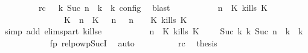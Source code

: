 \begin{isabellebody}
\ \ \ \ \ \ \ \ \ rc{\isacharcolon}{\isacartoucheopen}{\isasymrho}\ {\isasymin}\ {\isasymlbrakk}\ {\isasymGamma}\isactrlsub k{\isacharcomma}\ Suc\ n\ {\isasymturnstile}\ {\isasymPsi}\isactrlsub k\ {\isasymtriangleright}\ {\isasymPhi}\isactrlsub k\ {\isasymrbrakk}\isactrlsub c\isactrlsub o\isactrlsub n\isactrlsub f\isactrlsub i\isactrlsub g{\isacartoucheclose}\ \isamarkupfalse%
\ blast\isanewline
\ \ \ \ \ \ \ \ \isamarkupfalse%
\ {\isacartoucheopen}{\isacharparenleft}{\isasymGamma}{\isacharcomma}\ n\ {\isasymturnstile}\ {\isacharparenleft}{\isacharparenleft}K\ kills\ K\ {\isacharhash}\ {\isasymPsi}{\isacharparenright}\ {\isasymtriangleright}\ {\isasymPhi}{\isacharparenright}\isanewline
\ \ \ \ \ \ \ \ \ \ \ \ \ \ {\isasymhookrightarrow}\ {\isacharparenleft}{\isacharparenleft}{\isacharparenleft}K\ {\isasymUp}\ n{\isacharparenright}\ {\isacharhash}\ {\isacharparenleft}K\ {\isasymnot}{\isasymUp}\ {\isasymge}\ n{\isacharparenright}\ {\isacharhash}\ {\isasymGamma}{\isacharparenright}{\isacharcomma}\ n\ {\isasymturnstile}\ {\isasymPsi}\ {\isasymtriangleright}\ {\isacharparenleft}{\isacharparenleft}K\ kills\ K\ {\isacharhash}\ {\isasymPhi}{\isacharparenright}{\isacharparenright}{\isacartoucheclose}\isanewline
\ \ \ \ \ \ \ \ \ \ \isamarkupfalse%
\ {\isacharparenleft}simp\ add{\isacharcolon}\ elims{\isacharunderscore}part\ kills{\isacharunderscore}e{}{\isacharparenright}\isanewline
\ \ \ \ \ \ \ \ \isamarkupfalse%
\ {\isacartoucheopen}{\isacharparenleft}{\isasymGamma}{\isacharcomma}\ n\ {\isasymturnstile}\ {\isacharparenleft}{\isacharparenleft}K\ kills\ K\ {\isacharhash}\ {\isasymPsi}{\isacharparenright}\ {\isasymtriangleright}\ {\isasymPhi}{\isacharparenright}\ {\isasymhookrightarrow}\isactrlbsup Suc\ k\isactrlesup \ {\isacharparenleft}{\isasymGamma}\isactrlsub k{\isacharcomma}\ Suc\ n\ {\isasymturnstile}\ {\isasymPsi}\isactrlsub k\ {\isasymtriangleright}\ {\isasymPhi}\isactrlsub k{\isacharparenright}{\isacartoucheclose}\isanewline
\ \ \ \ \ \ \ \ \ \ \isamarkupfalse%
\ fp\ relpowp{\isacharunderscore}Suc{\isacharunderscore}I{}\ \isamarkupfalse%
\ auto\isanewline
\ \ \ \ \ \ \ \ \isamarkupfalse%
\ rc\ \isamarkupfalse%
\ {\isacharquery}thesis\ \isamarkupfalse%

\end{isabellebody}
